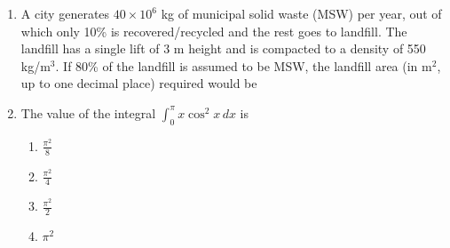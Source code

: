 \documentclass[journal,12pt,onecolumn]{IEEEtran}
\theoremstyle{remark}
\begin{document}
\begin{enumerate}
\item A city generates $40 \times 10^6$ kg of municipal solid waste (MSW) per year, out of which only 10\% is recovered/recycled and the rest goes to landfill. The landfill has a single lift of 3 m height and is compacted to a density of 550 kg/m$^3$. If 80\% of the landfill is assumed to be MSW, the landfill area (in m$^2$, up to one decimal place) required would be \underline{\hspace{1cm}}\\

\begin{large}

\end{large}

\item The value of the integral $\int_{0}^{\pi} x \cos^2 x \, dx $ is
\begin{multicols}{4}

    \begin{enumerate}
        \item $\frac{\pi^2}{8}$
        \item $\frac{\pi^2}{4}$
        \item $\frac{\pi^2}{2}$
        \item $\pi^2$
    \end{enumerate}
\end{multicols}
\end{enumerate}
\end{document}
